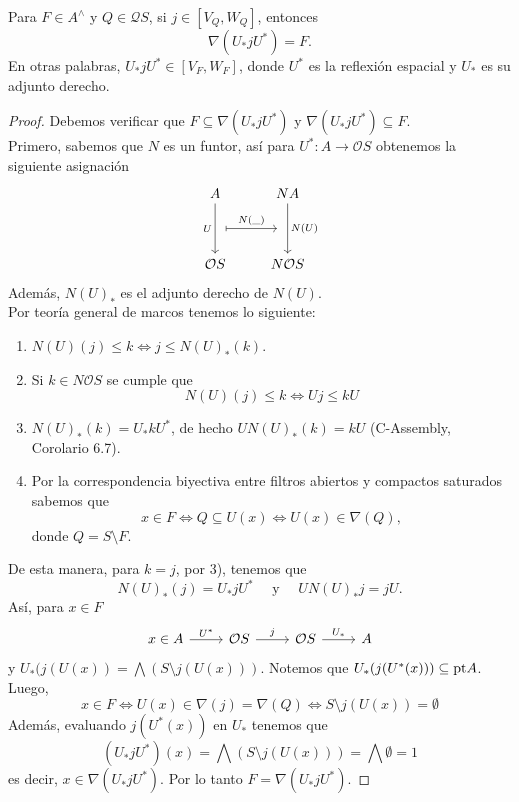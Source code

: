\begin{prop}
    Para $F\in A^\wedge$ y $Q\in \mathcal{Q}S$, si $j\in [V_Q, W_Q]$, entonces 
    \[
    \nabla(U_* j U^*)=F.
    \]
    En otras palabras, $U_*jU^*\in [V_F,W_F]$, donde $U^*$ es la reflexión espacial y $U_*$ es su adjunto derecho.
\end{prop}

\begin{proof}
    Debemos verificar que $F\subseteq \nabla(U_*jU^*)$ y $\nabla(U_*jU^*)\subseteq F$.\\

    Primero, sabemos que $N$ es un funtor, así para $U^*\colon A\to \mathcal{O}S$ obtenemos la siguiente asignación
   \[\begin{tikzcd}
	A & NA \\
	\\
	{\mathcal{O}S} & {N\mathcal{O}S}
	\arrow[""{name=0, anchor=center, inner sep=0}, "U"', from=1-1, to=3-1]
	\arrow[""{name=1, anchor=center, inner sep=0}, "{N(U)}", from=1-2, to=3-2]
	\arrow["{N(\_)}", shorten <=7pt, shorten >=7pt, maps to, from=0, to=1]
\end{tikzcd}\]
Además, $N(U)_*$ es el adjunto derecho de $N(U)$.\\

Por teoría general de marcos tenemos lo siguiente:
\begin{enumerate}
    \item $N(U)(j)\leq k\Leftrightarrow j\leq N(U)_*(k)$.
    \item Si $k\in N\mathcal{O}S$ se cumple que 
    \[
    N(U)(j)\leq k\Leftrightarrow Uj\leq kU
    \]
    \item $N(U)_*(k)=U_*kU^*$, de hecho $UN(U)_*(k)=kU$ (C-Assembly, Corolario 6.7).
    \item Por la correspondencia biyectiva entre filtros abiertos y compactos saturados sabemos que 
    \[
    x\in F\Leftrightarrow Q\subseteq U(x)\Leftrightarrow U(x)\in \nabla(Q),
    \]
    donde $Q=S\setminus F$.
\end{enumerate}
De esta manera, para $k=j$, por 3), tenemos que 
\[
N(U)_*(j)=U_*jU^* \quad\mbox{ y }\quad UN(U)_*j=jU.
\] 
Así, para $x\in F$
\[\begin{tikzcd}
	x\in A & {\mathcal{O}S} & {\mathcal{O}S} & A
	\arrow["{U^*}", from=1-1, to=1-2]
	\arrow["j", from=1-2, to=1-3]
	\arrow["{U_*}", from=1-3, to=1-4]
\end{tikzcd}\]
y $U_*(j(U(x))=\bigwedge(S\setminus j(U(x)))$. Notemos que $U_*(j(U^*(x)))\subseteq \mathrm{pt} A$. Luego,
\[
x\in F \Leftrightarrow U(x)\in \nabla(j)=\nabla(Q)\Leftrightarrow S\setminus j(U(x))=\emptyset
\]
Además, evaluando $j(U^*(x))$ en $U_*$ tenemos que 
\[
(U_*jU^*)(x)=\bigwedge (S\setminus j(U(x)))=\bigwedge\emptyset=1
\]
es decir, $x\in \nabla(U_*jU^*)$. Por lo tanto $F=\nabla(U_*jU^*)$.
\end{proof}

